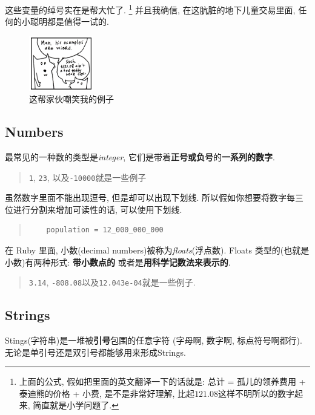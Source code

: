 这些变量的绰号实在是帮大忙了. 
\footnote{上面的公式, 假如把里面的英文翻译一下的话就是: 总计 = 孤儿的领养费用 + 泰迪熊的价格 + 小费, 是不是非常好理解, 比起$121.08$这样不明所以的数字起来, 简直就是小学问题了. }
并且我确信, 在这肮脏的地下儿童交易里面, 任何的小聪明都是值得一试的. 

\begin{figure}[h]
  \centering
  \includegraphics[width=0.25\textwidth]{image/why/foxes-4a.png}
  \caption{这帮家伙嘲笑我的例子}
\end{figure}

\subsection*{Numbers}
最常见的一种数的类型是\emph{integer}, 
它们是带着\textbf{正号或负号}的\textbf{一系列的数字}. 

\begin{quotation}
  \texttt{1}, \texttt{23}, 以及\texttt{-10000}就是一些例子
\end{quotation}

虽然数字里面不能出现逗号, 但是却可以出现下划线. 
所以假如你想要将数字每三位进行分割来增加可读性的话, 可以使用下划线. 

\begin{quotation}
  \begin{verbatim}
    population = 12_000_000_000
  \end{verbatim}
\end{quotation}

在 Ruby 里面, 小数(decimal numbers)被称为\emph{floats}(浮点数). 
Floats 类型的(也就是小数)有两种形式: \textbf{带小数点的}
或者是\textbf{用科学记数法来表示的}. 

\begin{quotation}
  \texttt{3.14}, \texttt{-808.08}以及\texttt{12.043e-04}就是一些例子. 
\end{quotation}

\subsection*{Strings}
Stings(字符串)是一堆被\textbf{引号}包围的任意字符
(字母啊, 数字啊, 标点符号啊都行). 
无论是单引号还是双引号都能够用来形成Strings. 

